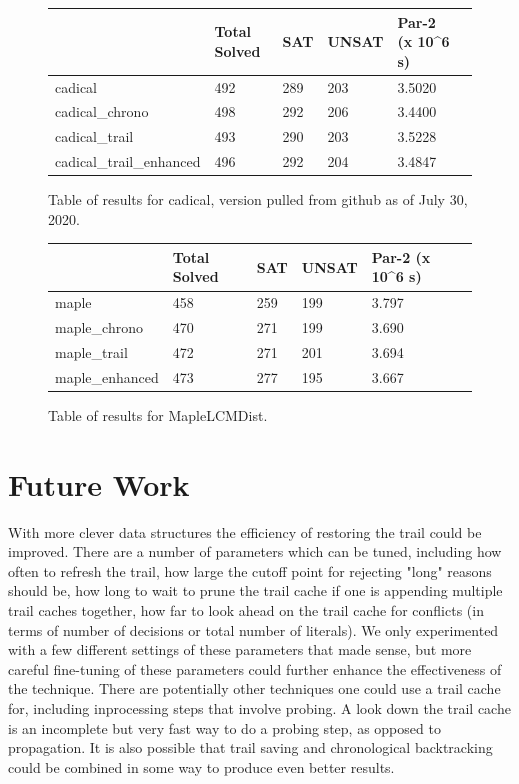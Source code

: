 \documentclass{article}
\begin{document}
\begin{figure}
\begin{tabular}{|l|l|l|l|l|l|}
\hline
                         & Total Solved & SAT & UNSAT & Par-2 (x 10\textasciicircum{}6 s) \\ \hline
cadical                  & 492          & 289 &  203  & 3.5020                            \\ \hline
cadical\_chrono          & 498          & 292 &  206  & 3.4400                            \\ \hline
cadical\_trail           & 493          & 290 &  203  & 3.5228                            \\ \hline
cadical\_trail\_enhanced & 496          & 292 &  204  & 3.4847                            \\ \hline
\end{tabular}
\caption{Table of results for cadical, version pulled from github as of July 30, 2020.}
\end{figure}

\begin{figure}
\begin{tabular}{|l|l|l|l|l|l|}
\hline
                & Total Solved & SAT & UNSAT & Par-2 (x 10\textasciicircum{}6 s) \\ \hline
maple           & 458          & 259 &  199  & 3.797                             \\ \hline
maple\_chrono   & 470          & 271 &  199  & 3.690                             \\ \hline
maple\_trail    & 472          & 271 &  201  & 3.694                             \\ \hline
maple\_enhanced & 473          & 277 &  195  & 3.667                             \\ \hline
\end{tabular}
\caption{Table of results for MapleLCMDist.}
\end{figure}
\clearpage

\section{Future Work}

With more clever data structures the efficiency of restoring the trail could be improved. There are a number of parameters which can be tuned, including how often to refresh the trail, how large the cutoff point for rejecting "long" reasons should be, how long to wait to prune the trail cache if one is appending multiple trail caches together, how far to look ahead on the trail cache for conflicts (in terms of number of decisions or total number of literals). We only experimented with a few different settings of these parameters that made sense, but more careful fine-tuning of these parameters could further enhance the effectiveness of the technique. There are potentially other techniques one could use a trail cache for, including inprocessing steps that involve probing. A look down the trail cache is an incomplete but very fast way to do a probing step, as opposed to propagation. It is also possible that trail saving and chronological backtracking could be combined in some way to produce even better results.
{}

\end{document}
